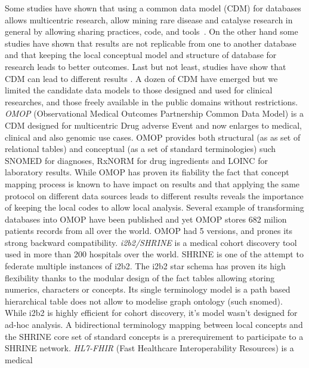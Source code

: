 Some studies have shown that using a common data model (CDM) for databases
allows multicentric research, allow mining rare disease  and
catalyse research in general by allowing sharing practices, code, and
tools \cite{cdm-review}. On the other hand some studies have shown that results are
not replicable from one to another database \cite{omop-replicability} and that
keeping the local conceptual model \cite{fhir-deep} and structure
\cite{imi-protect} of database for research leads to better outcomes. Last but
not least, studies have show that CDM can lead to different results
\cite{cdm-comparison}.
A dozen of CDM have emerged but we limited the candidate data models to those
designed and used for clinical researches, and those freely available in the
public domains without restrictions.
\emph{OMOP} (Observational Medical Outcomes Partnership Common Data Model) is
a CDM designed for multicentric Drug adverse Event and now enlarges to medical,
clinical and also genomic use cases. OMOP provides both structural (as as set
of relational tables) and conceptual (as a set of standard terminologies) such
SNOMED for diagnoses, RxNORM for drug ingredients and LOINC for laboratory
results. While OMOP has proven its fiability \cite{omop-eval} the fact that
concept mapping process is known to have impact on results
\cite{omop-concept-impact} and that applying the same protocol on different
data sources leads to different results \cite{omop-replicability} reveals the
importance of keeping the local codes to allow local analysis. Several example
of transforming databases into OMOP have been published
\cite{omop-german,omop-nashville} and yet OMOP stores 682 milion patients
records from all over the world\cite{omop-bigboy}. OMOP had 5 versions, and
prones its strong backward compatibility.
\emph{i2b2/SHRINE} is a medical cohort discovery tool used in more than 200
hospitals over the world. SHRINE is one of the attempt to federate multiple
instances of i2b2. The i2b2 star schema has proven its high flexibility thanks
to the modular design of the fact tables allowing storing numerics, characters
or concepts. Its single terminology model is a path based hierarchical table
does not allow to modelise graph ontology (such snomed). While i2b2 is highly
efficient for cohort discovery, it's model wasn't designed for ad-hoc analysis.
A bidirectional terminology mapping \cite{shrine-design} between local concepts
and the SHRINE core set of standard concepts is a prerequirement to participate
to a SHRINE network.
\emph{HL7-FHIR} (Fast Healthcare Interoperability Resources) is a medical
